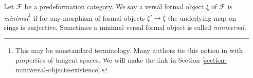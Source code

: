\begin{definition}
\label{definition-minimal-versal}
Let $\mathcal{F}$ be a predeformation category.
We say a versal formal object $\xi$ of $\mathcal{F}$ is
{\it minimal}\footnote{This may be nonstandard terminology. Many
authors tie this notion in with properties of tangent spaces.
We will make the link in
Section \ref{section-miniversal-objects-existence}.}
if for any morphism of formal objects
$\xi' \to \xi$ the underlying map on rings is surjective.
Sometimes a minimal versal formal object is called {\it miniversal}.
\end{definition}